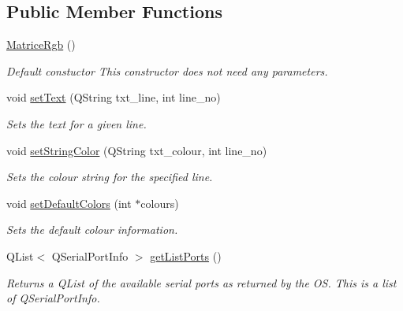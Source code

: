 \subsection*{Public Member Functions}
\begin{DoxyCompactItemize}
\item 
\hypertarget{class_matrice_rgb_aea79aaf12329d33f4f0d5f06d15929a6}{\hyperlink{class_matrice_rgb_aea79aaf12329d33f4f0d5f06d15929a6}{Matrice\+Rgb} ()}\label{class_matrice_rgb_aea79aaf12329d33f4f0d5f06d15929a6}

\begin{DoxyCompactList}\small\item\em Default constuctor This constructor does not need any parameters. \end{DoxyCompactList}\item 
void \hyperlink{class_matrice_rgb_a2e60d3e1608cf676b597aa3bbe7ffbe7}{set\+Text} (Q\+String txt\+\_\+line, int line\+\_\+no)
\begin{DoxyCompactList}\small\item\em Sets the text for a given line. \end{DoxyCompactList}\item 
void \hyperlink{class_matrice_rgb_aaf8facb904df841ef6f22a842715a2b9}{set\+String\+Color} (Q\+String txt\+\_\+colour, int line\+\_\+no)
\begin{DoxyCompactList}\small\item\em Sets the colour string for the specified line. \end{DoxyCompactList}\item 
void \hyperlink{class_matrice_rgb_ad7ed9e4715ed21491f33b3db48f5d436}{set\+Default\+Colors} (int $\ast$colours)
\begin{DoxyCompactList}\small\item\em Sets the default colour information. \end{DoxyCompactList}\item 
Q\+List$<$ Q\+Serial\+Port\+Info $>$ \hyperlink{class_matrice_rgb_a49199cd529e603db49cffd85b813e49a}{get\+List\+Ports} ()
\begin{DoxyCompactList}\small\item\em Returns a Q\+List of the available serial ports as returned by the O\+S. This is a list of Q\+Serial\+Port\+Info. \end{DoxyCompactList}\end{DoxyCompactItemize}
